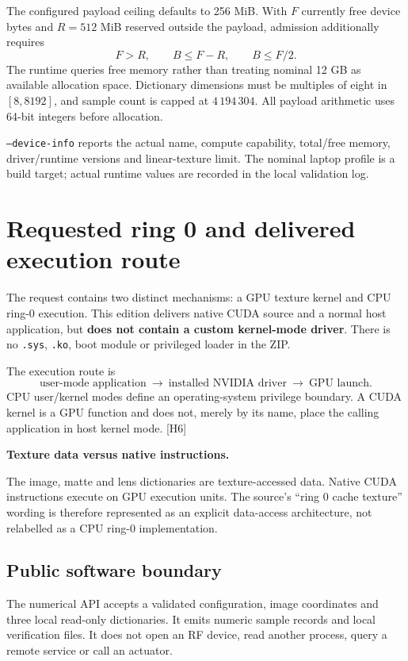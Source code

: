 \documentclass[11pt,a4paper]{article}
\newcommand{\hw}[1]{\textcolor{muted}{[H#1]}}
\newcommand{\code}[1]{\texttt{#1}}
\begin{document}
The configured payload ceiling defaults to 256 MiB. With $F$ currently free device bytes and $R=512$ MiB reserved outside the payload, admission additionally requires
\begin{equation}
F>R,\qquad B\le F-R,\qquad B\le F/2.
\end{equation}
The runtime queries free memory rather than treating nominal 12 GB as available allocation space. Dictionary dimensions must be multiples of eight in $[8,8192]$, and sample count is capped at $4\,194\,304$. All payload arithmetic uses 64-bit integers before allocation.

\code{--device-info} reports the actual name, compute capability, total/free memory, driver/runtime versions and linear-texture limit. The nominal laptop profile is a build target; actual runtime values are recorded in the local validation log.
\clearpage

\section{Requested ring 0 and delivered execution route}
The request contains two distinct mechanisms: a GPU texture kernel and CPU ring-0 execution. This edition delivers native CUDA source and a normal host application, but \textbf{does not contain a custom kernel-mode driver}. There is no \code{.sys}, \code{.ko}, boot module or privileged loader in the ZIP.

The execution route is
\begin{equation}
\text{user-mode application}\ \longrightarrow\ \text{installed NVIDIA driver}\ \longrightarrow\ \text{GPU launch}.
\end{equation}
CPU user/kernel modes define an operating-system privilege boundary. A CUDA kernel is a GPU function and does not, merely by its name, place the calling application in host kernel mode. \hw{6}

\begin{panel}
\textbf{Texture data versus native instructions.}\par
The image, matte and lens dictionaries are texture-accessed data. Native CUDA instructions execute on GPU execution units. The source's ``ring 0 cache texture'' wording is therefore represented as an explicit data-access architecture, not relabelled as a CPU ring-0 implementation.
\end{panel}

\subsection{Public software boundary}
The numerical API accepts a validated configuration, image coordinates and three local read-only dictionaries. It emits numeric sample records and local verification files. It does not open an RF device, read another process, query a remote service or call an actuator.
\end{document}
